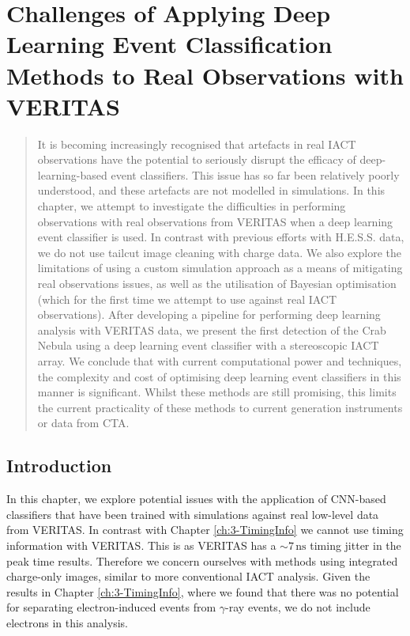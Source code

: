 \chapter{\label{ch:4-VERITASRealData} Challenges of Applying Deep Learning Event Classification Methods to Real Observations with VERITAS}
\minitoc
\begin{abstract}
    It is becoming increasingly recognised that artefacts in real IACT observations have the potential to seriously disrupt the efficacy of deep-learning-based event classifiers. This issue has so far been relatively poorly understood, and these artefacts are not modelled in simulations. In this chapter, we attempt to investigate the difficulties in performing observations with real observations from VERITAS when a deep learning event classifier is used. In contrast with previous efforts with H.E.S.S. data, we do not use tailcut image cleaning with charge data. We also explore the limitations of using a custom simulation approach as a means of mitigating real observations issues, as well as the utilisation of Bayesian optimisation (which for the first time we attempt to use against real IACT observations). After developing a pipeline for performing deep learning analysis with VERITAS data, we present the first detection of the Crab Nebula using a deep learning event classifier with a stereoscopic IACT array. We conclude that with current computational power and techniques, the complexity and cost of optimising deep learning event classifiers in this manner is significant. Whilst these methods are still promising, this limits the current practicality of these methods to current generation instruments or data from CTA.
\end{abstract}

\section{Introduction}

In this chapter, we explore potential issues with the application of CNN-based classifiers that have been trained with simulations against real low-level data from VERITAS. In contrast with Chapter \ref{ch:3-TimingInfo} we cannot use timing information with VERITAS. This is as VERITAS has a $\mathrm{\sim7\,ns}$ timing jitter in the peak time results. Therefore we concern ourselves with methods using integrated charge-only images, similar to more conventional IACT analysis. Given the results in Chapter \ref{ch:3-TimingInfo}, where we found that there was no potential for separating electron-induced events from $\gamma$-ray events, we do not include electrons in this analysis. 

